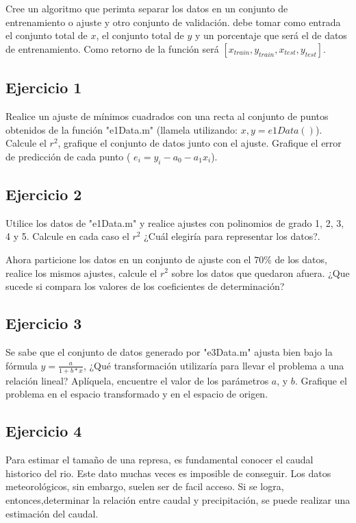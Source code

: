 \documentclass[a4paper,11pt]{article}
\theoremstyle{mytheor}
\begin{document}
\begin{enumerate}[label=\Roman*]
Cree un algoritmo que perimta separar los datos en un conjunto de entrenamiento o ajuste y otro conjunto de validación. debe tomar como entrada el conjunto total de $x$, el conjunto total de $y$ y un porcentaje  que será el de datos de entrenamiento. Como retorno de la función será $[x_{train},y_{train},x_{test},y_{test}]$.



\end{enumerate}

\subsection*{Ejercicio 1}
Realice un ajuste de mínimos cuadrados con una recta al conjunto de puntos obtenidos de la función "e1Data.m" (llamela utilizando: $x,y = e1Data()$). Calcule el $r^2$, grafique el conjunto de datos junto con el ajuste. Grafique el error de predicción de cada punto ( $e_i = y_i - a_0 -a_1 x_i$).

\subsection*{Ejercicio 2}
Utilice los datos de "e1Data.m" y realice ajustes con polinomios de grado 1, 2, 3, 4 y 5. Calcule en cada caso el $r^2$ ¿Cuál elegiría para representar los datos?. 

Ahora particione los datos en un conjunto de ajuste con el $70\%$ de los datos, realice los mismos ajustes, calcule el $r^2$ sobre los datos que quedaron afuera. ¿Que sucede si compara los valores de los coeficientes de determinación?

\subsection*{Ejercicio 3}

Se sabe que el conjunto de datos generado por "e3Data.m" ajusta bien bajo la fórmula $y = \frac{a}{1+b*x}$, ¿Qué transformación utilizaría para llevar el problema a una relación lineal? Aplíquela, encuentre el valor de los parámetros $a$, y $b$. Grafique el problema en el espacio transformado y en el espacio de origen.



\subsection*{Ejercicio 4}

Para estimar el tamaño de una represa, es fundamental conocer el caudal historico del rio. Este dato muchas veces es imposible de conseguir. Los datos meteorológicos, sin embargo, suelen ser de facil acceso. Si se logra, entonces,determinar la relación entre caudal y precipitación, se puede realizar una estimación del caudal.
\end{document}
